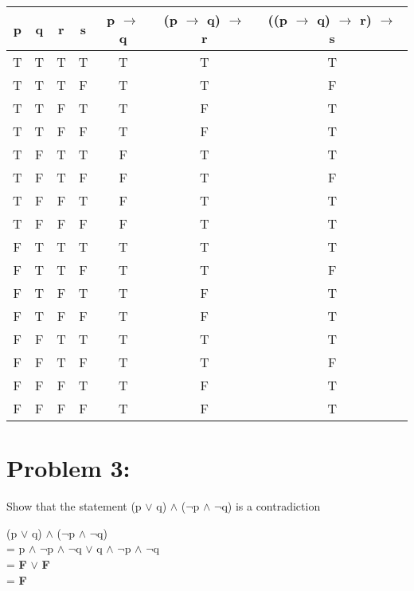 \documentclass[12pt,en,a4paper]{article}
\begin{document}
	\begin{tabular}{|c|c|c|c|c|c|c|}
		\hline
		p & q & r & s & p $\rightarrow$ q & (p $\rightarrow$ q) $\rightarrow$ r & ((p $\rightarrow$ q) $\rightarrow$ r) $\rightarrow$ s \\
		\hline
		T & T & T & T & T & T & T\\
		\hline
		T & T & T & F & T & T & F\\
		\hline
		T & T & F & T & T & F & T\\
		\hline
		T & T & F & F & T & F & T\\
		\hline
		T & F & T & T & F & T & T\\
		\hline
		T & F & T & F & F & T & F\\
		\hline
		T & F & F & T & F & T & T\\
		\hline
		T & F & F & F & F & T & T\\
		\hline
		F & T & T & T & T & T & T\\
		\hline
		F & T & T & F & T & T & F\\
		\hline
		F & T & F & T & T & F & T\\
		\hline
		F & T & F & F & T & F & T\\
		\hline
		F & F & T & T & T & T & T\\
		\hline
		F & F & T & F & T & T & F\\
		\hline
		F & F & F & T & T & F & T\\
		\hline
		F & F & F & F & T & F & T\\
		\hline
	\end{tabular}
\newpage
{}
	\section*{Problem 3:}
	Show that the statement (p $\vee$ q) $\wedge$ ($\neg$p $\wedge$ $\neg$q) is a contradiction
	
	(p $\vee$ q) $\wedge$ ($\neg$p $\wedge$ $\neg$q)\\
	= p $\wedge$ $\neg$p $\wedge$ $\neg$q $\vee$ q $\wedge$ $\neg$p $\wedge$ $\neg$q\\
	= \textbf{F} $\vee$ \textbf{F}\\
	= \textbf{F}
\newpage
{}
\end{document}
